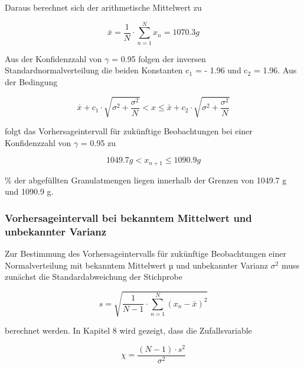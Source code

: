 \noindent Daraus berechnet sich der arithmetische Mittelwert zu 

\begin{equation}\label{eq:fivehundredthirty}
\bar{x}=\dfrac{1}{N} \cdot \sum\limits _{n=1}^{N}x_{n}  =1070.3 g
\end{equation}

\noindent Aus der Konfidenzzahl von $\gamma$ = 0.95 folgen der inversen Standardnormalverteilung die beiden Konstanten c${}_{1}$ = - 1.96 und c${}_{2}$ = 1.96. Aus der Bedingung

\begin{equation}\label{eq:fivehundredthirtyone}
\bar{x}+c_{1} \cdot \sqrt{\sigma ^{2} +\dfrac{\sigma ^{2} }{N} } <x\le \bar{x}+c_{2} \cdot \sqrt{\sigma ^{2} +\dfrac{\sigma ^{2} }{N} }
\end{equation}

\noindent folgt das Vorhersageintervall f\"{u}r zuk\"{u}nftige Beobachtungen bei einer Konfidenzzahl von $\gamma$ = 0.95 zu

\begin{equation}\label{eq:fivehundredthirtytwo}
1049.7 g<x_{n+1} \le 1090.9 g
\end{equation}

 \% der abgef\"{u}llten Granulatmengen liegen innerhalb der Grenzen von 1049.7 g und 1090.9 g.

\subsubsection{Vorhersageintervall bei bekanntem Mittelwert und unbekannter Varianz}

\noindent Zur Bestimmung des Vorhersageintervalls f\"{u}r zuk\"{u}nftige Beobachtungen einer Normalverteilung mit bekanntem Mittelwert µ und unbekannter Varianz $\sigma^{2}$ muss zun\"{a}chst die Standardabweichung der Stichprobe

\begin{equation}\label{eq:fivehundredthirtythree}
s=\sqrt{\dfrac{1}{N-1} \cdot \sum _{n=1}^{N}\left(x_{n} -\bar{x}\right)^{2}}
\end{equation}

\noindent berechnet werden. In Kapitel 8 wird gezeigt, dass die Zufallsvariable

\begin{equation}\label{eq:fivehundredthirtyfour}
\chi =\dfrac{\left(N-1\right)\cdot s^{2} }{\sigma ^{2}}
\end{equation}

